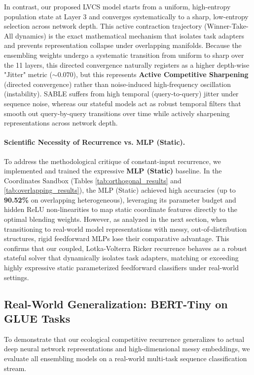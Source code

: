 In contrast, our proposed LVCS model starts from a uniform, high-entropy population state at Layer 3 and converges systematically to a sharp, low-entropy selection across network depth. This active contraction trajectory (Winner-Take-All dynamics) is the exact mathematical mechanism that isolates task adapters and prevents representation collapse under overlapping manifolds. Because the ensembling weights undergo a systematic transition from uniform to sharp over the 11 layers, this directed convergence naturally registers as a higher depth-wise "Jitter" metric ($\sim 0.070$), but this represents \textbf{Active Competitive Sharpening} (directed convergence) rather than noise-induced high-frequency oscillation (instability). SABLE suffers from high temporal (query-to-query) jitter under sequence noise, whereas our stateful models act as robust temporal filters that smooth out query-by-query transitions over time while actively sharpening representations across network depth.

\paragraph{Scientific Necessity of Recurrence vs. MLP (Static).}
To address the methodological critique of constant-input recurrence, we implemented and trained the expressive \textbf{MLP (Static)} baseline. In the Coordinates Sandbox (Tables \ref{tab:orthogonal_results} and \ref{tab:overlapping_results}), the MLP (Static) achieved high accuracies (up to \textbf{90.52\%} on overlapping heterogeneous), leveraging its parameter budget and hidden ReLU non-linearities to map static coordinate features directly to the optimal blending weights. However, as analyzed in the next section, when transitioning to real-world model representations with messy, out-of-distribution structures, rigid feedforward MLPs lose their comparative advantage. This confirms that our coupled, Lotka-Volterra Ricker recurrence behaves as a robust stateful solver that dynamically isolates task adapters, matching or exceeding highly expressive static parameterized feedforward classifiers under real-world settings.

\subsection{Real-World Generalization: BERT-Tiny on GLUE Tasks}
To demonstrate that our ecological competitive recurrence generalizes to actual deep neural network representations and high-dimensional messy embeddings, we evaluate all ensembling models on a real-world multi-task sequence classification stream. 

